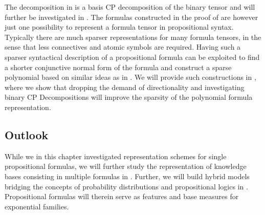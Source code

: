 \begin{remark}
    The decomposition in  is a basis CP decomposition of the binary tensor and will further be investigated in .
    The formulas constructed in the proof of  are however just one possibility to represent a formula tensor in propositional syntax.
    Typically there are much sparser representations for many formula tensors, in the sense that less connectives and atomic symbols are required.
    Having such a sparser syntactical description of a propositional formula can be exploited to find a shorter conjunctive normal form of the formula and construct a sparse polynomial based on similar ideas as in .
    We will provide such constructions in , where we show that dropping the demand of directionality and investigating binary CP Decompositions will improve the sparsity of the polynomial formula representation.
\end{remark}

\subsection{Outlook}

While we in this chapter investigated representation schemes for single propositional formulas, we will further study the representation of knowledge bases consisting in multiple formulas in .
Further, we will build hybrid models bridging the concepts of probability distributions and propositional logics in .
Propositional formulas will therein serve as features and base measures for exponential families.
